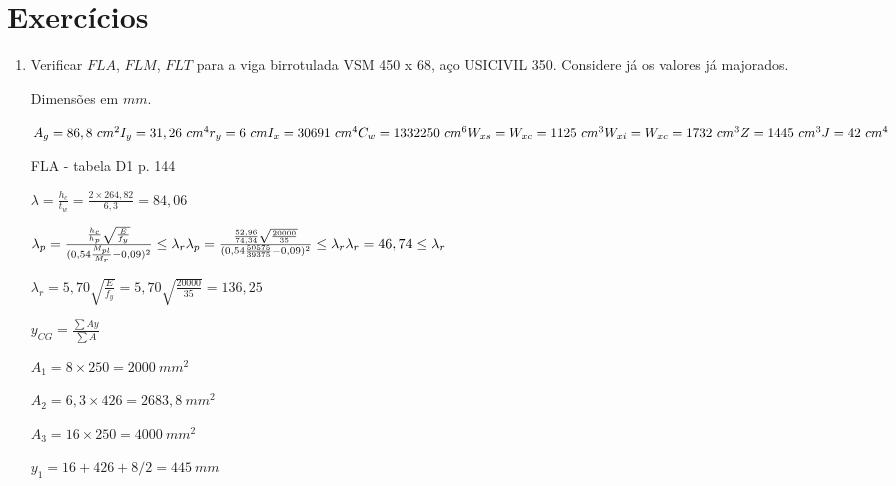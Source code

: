 \cabecalho

\section*{Exercícios}

\begin{enumerate}

    \item Verificar $FLA$, $FLM$, $FLT$ para a viga birrotulada VSM 450 x 68, aço USICIVIL 350. Considere já os valores já majorados.
    
    

    

    

    Dimensões em $mm$.

    $A_g = 86,8 \ cm^2 \newline I_y = 31,26 \ cm^4 \newline r_y = 6 \ cm \newline I_x = 30691 \ cm^4 \newline C_w = 1332250 \ cm^6 \newline W_{xs} = W_{xc} = 1125 \ cm^3 \newline W_{xi} = W_{xc} = 1732 \ cm^3 \newline Z = 1445 \ cm^3 \newline J = 42 \ cm^4$

    FLA - tabela D1 p. 144

    $\lambda = \frac{h_c}{t_w} = \frac{2 \times 264,82}{6,3} = 84,06$

    $\lambda_p = \frac{\frac{h_c}{h_p} \sqrt{\frac{E}{f_y}}}{(0,54 \frac{M_{pl}}{M_r}-0,09)^2} \leq \lambda_r \newline \lambda_p = \frac{\frac{52,96}{74,34} \sqrt{\frac{20000}{35}}}{(0,54 \frac{50575}{39375}-0,09)^2} \leq \lambda_r \newline \lambda_r = 46,74 \leq \lambda_r$

    $\lambda_r = 5,70 \sqrt{\frac{E}{f_y}} = 5,70 \sqrt{\frac{20000}{35}} = 136,25$

    $y_{CG}=\frac{\sum Ay}{\sum A}$

    $A_1 = 8 \times 250 = 2000 \ mm^2$

    $A_2 = 6,3 \times 426 = 2683,8 \ mm^2$

    $A_3 = 16 \times 250 = 4000 \ mm^2$

    $y_1 = 16+426 + 8/2 = 445 \ mm$


\end{enumerate}
